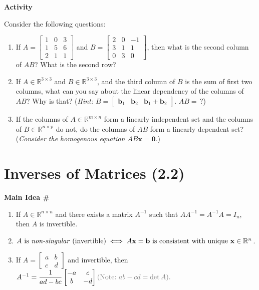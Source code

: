 \documentclass[titlepage, a4paper, 10pt]{article}
\renewcommand{\vec}[1]{\mathbf{#1}}
\newcounter{mainideas}
\newcommand{\mainidea}{\textbf{Main Idea \#\themainideas \stepcounter{mainideas}}}
\newenvironment{mideea}[1]
{%
\begin{lrbox}{\mybox}%
	\begin{minipage}{#1\textwidth}
		{\centering \mainidea \par}

}
{\end{minipage}\end{lrbox}\begin{center}\fbox{\usebox{\mybox}}\end{center}}
\newcounter{activity}
\newenvironment{newactivity}
{
	\noindent\textbf{Activity \theactivity}
}
{
\stepcounter{activity}
\par
}
\begin{document}
	\begin{newactivity}
		Consider the following questions:
		\begin{enumerate}
			\item If \(A = \begin{bmatrix}1 & 0 & 3 \\ 1 & 5 & 6 \\ 2 & 1 & 1\end{bmatrix}\) and \(B = \begin{bmatrix}2 & 0 & -1\\ 3 & 1 & 1\\ 0 & 3 & 0\end{bmatrix}\), then what is the second column of \(AB\)? What is the second row?
			\item If \(A \in \mathbb{R}^{3 \times 3}\) and \(B \in \mathbb{R}^{3 \times 3}\), and the third column of \(B\) is the sum of first two columns,
				what can you say about the linear dependency of the columns of \(AB\)? Why is that? (\textit{Hint: \(B = \begin{bmatrix}\vec{b}_1 & \vec{b}_2 & \vec{b}_1 + \vec{b}_2\end{bmatrix}\)}. \(AB = \, ?\))
			\item If the columns of \(A \in \mathbb{R}^{m \times n}\) form a linearly independent set and the columns of \(B \in \mathbb{R}^{n \times p}					\) do not, do the columns of \(AB\) form a linearly dependent set? (\textit{Consider the homogenous equation \(AB\vec{x} = \vec{0}\)}.)
		\end{enumerate}
	\end{newactivity}

\section{\centering Inverses of Matrices (2.2)}
\begin{mideea}{0.9}
	\begin{enumerate}
		\item If \(A \in \mathbb{R}^{n \times n}\) and there exists a matrix \(A^{-1}\) such that \(A A^{-1} = A^{-1}A = I_n\), then \(A\) is invertible.
		\item \(A \ \text{is \emph{non-singular} (invertible)} \iff A\vec{x} = \vec{b} \ \text{is consistent with unique} \ \vec{x} \in \mathbb{R}^n\).
		\item If \(A = \begin{bmatrix}a & b \\ c & d\end{bmatrix}\) and invertible, then 
		\(A^{-1} = \displaystyle \frac{1}{ad -bc} \begin{bmatrix}-a & c \\ b & -d\end{bmatrix} \color{gray} (\text{Note:} \ ab - cd = \det A).\)
	\end{enumerate}
\end{mideea}
\end{document}
